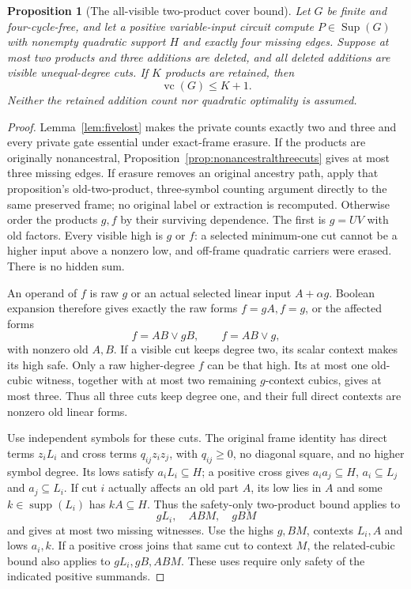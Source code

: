 \documentclass[11pt]{article}
\newcommand{\supp}{\operatorname{supp}}
\newcommand{\Sup}{\operatorname{Sup}}
\newcommand{\vc}{\operatorname{vc}}
\newtheorem{proposition}[theorem]{Proposition}
\theoremstyle{definition}
\theoremstyle{remark}
\begin{document}
\begin{proposition}[The all-visible two-product cover bound]\label{prop:allvisibletwocover}
Let $G$ be finite and four-cycle-free, and let a positive variable-input circuit compute $P\in\Sup(G)$ with nonempty quadratic support $H$ and exactly four missing edges. Suppose at most two products and three additions are deleted, and all deleted additions are visible unequal-degree cuts. If $K$ products are retained, then
\[
 \vc(G)\le K+1.
\]
Neither the retained addition count nor quadratic optimality is assumed.
\end{proposition}
\begin{proof}
Lemma~\ref{lem:fivelost} makes the private counts exactly two and three and every private gate essential under exact-frame erasure. If the products are originally nonancestral, Proposition~\ref{prop:nonancestralthreecuts} gives at most three missing edges. If erasure removes an original ancestry path, apply that proposition's old-two-product, three-symbol counting argument directly to the same preserved frame; no original label or extraction is recomputed. Otherwise order the products $g,f$ by their surviving dependence. The first is $g=UV$ with old factors. Every visible high is $g$ or $f$: a selected minimum-one cut cannot be a higher input above a nonzero low, and off-frame quadratic carriers were erased. There is no hidden sum.

An operand of $f$ is raw $g$ or an actual selected linear input $A+\alpha g$. Boolean expansion therefore gives exactly the raw forms $f=gA,f=g$, or the affected forms
\[
 f=AB\vee gB,\qquad f=AB\vee g,
\]
with nonzero old $A,B$. If a visible cut keeps degree two, its scalar context makes its high safe. Only a raw higher-degree $f$ can be that high. Its at most one old-cubic witness, together with at most two remaining $g$-context cubics, gives at most three. Thus all three cuts keep degree one, and their full direct contexts are nonzero old linear forms.

Use independent symbols for these cuts. The original frame identity has direct terms $z_iL_i$ and cross terms $q_{ij}z_iz_j$, with $q_{ij}\ge0$, no diagonal square, and no higher symbol degree. Its lows satisfy $a_iL_i\subseteq H$; a positive cross gives $a_ia_j\subseteq H$, $a_i\subseteq L_j$ and $a_j\subseteq L_i$. If cut $i$ actually affects an old part $A$, its low lies in $A$ and some $k\in\supp(L_i)$ has $kA\subseteq H$. Thus the safety-only two-product bound applies to
\[
 gL_i,\quad ABM,\quad gBM
\]
and gives at most two missing witnesses. Use the highs $g,BM$, contexts $L_i,A$ and lows $a_i,k$. If a positive cross joins that same cut to context $M$, the related-cubic bound also applies to $gL_i,gB,ABM$. These uses require only safety of the indicated positive summands.


\end{proof}
\end{document}
